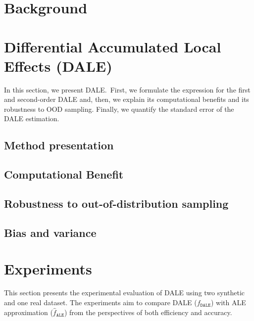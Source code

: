 \documentclass[wcp]{jmlr}
\begin{document}
\section{Background}

\label{sec:3-feature-effect}

\section{Differential Accumulated Local Effects (DALE)}

In this section, we present DALE.~First, we formulate the expression
for the first and second-order DALE and, then, we explain its
computational benefits and its robustness to OOD sampling. Finally, we
quantify the standard error of the DALE estimation.

\subsection{Method presentation}
\label{sec:4-1-DALE}


\subsection{Computational Benefit}
\label{sec:4-2-computational}


\subsection{Robustness to out-of-distribution sampling}
\label{sec:4-3-robustness}


\subsection{Bias and variance}
\label{sec:4-4-std}


% 

\section{Experiments}

This section presents the experimental evaluation of DALE using two
synthetic and one real dataset. The experiments aim to compare DALE
(\(f_{\mathtt{DALE}}\)) with ALE approximation
(\(\hat{f}_{\mathtt{ALE}}\)) from the perspectives of both efficiency
and accuracy.
\end{document}
